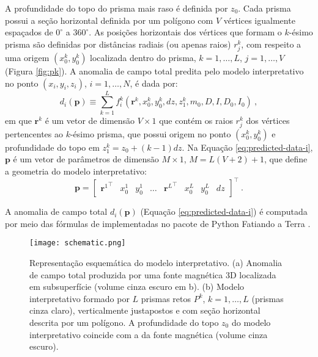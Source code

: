 A profundidade do topo do prisma mais raso é definida por $z_{0}$.
Cada prisma possui a seção horizontal definida por um polígono com $V$ vértices igualmente espaçados de $0^{\circ}$ a $360^{\circ}$.
As posições horizontais dos vértices que formam o $k$-ésimo prisma
são definidas por distâncias radiais (ou apenas raios) $r^{k}_{j}$, com respeito a uma origem $(x_{0}^{k}, y_{0}^{k})$ localizada dentro do prisma, $k = 1, \dots, L$, $j = 1, \dots, V$ (Figura \ref{fig:pk}).
A anomalia de campo total predita pelo modelo interpretativo no ponto $(x_{i}, y_{i}, z_{i})$, $i = 1, \dots, N$, é dada por:
\begin{equation}
d_{i} (\mathbf{p}) \equiv \sum\limits_{k=1}^{L} f_{i}^{k}(\mathbf{r}^{k}, x_{0}^{k}, y_{0}^{k}, dz, z_{1}^{k}, m_{0}, D, I, D_{0}, I_{0}) \: ,
\label{eq:predicted-data-i}
\end{equation}
em que $\mathbf{r}^{k}$ é um vetor de dimensão $V \times 1$ que contém os raios $r^{k}_{j}$ dos vértices pertencentes ao $k$-ésimo prisma, que possui origem no ponto $(x_{0}^{k}, y_{0}^{k})$ e profundidade do topo em $z_{1}^{k} = z_{0} + (k-1)dz$.
Na Equação \ref{eq:predicted-data-i}, $\mathbf{p}$ é um vetor de parâmetros de dimensão $M \times 1$, $ M=L(V+2) +1 $, que define a geometria do modelo interpretativo:
\begin{equation}
\mathbf{p} = \begin{bmatrix} 
{\mathbf{r}^{1}}^{\top} & x_{0}^{1} & y_{0}^{1} & \dots & 
{\mathbf{r}^{L}}^{\top} & x_{0}^{L} & y_{0}^{L} & dz
\end{bmatrix}^{\top} \: .
\label{eq:p-vector}
\end{equation}

A anomalia de campo total $d_{i} (\mathbf{p})$ 
(Equação \ref{eq:predicted-data-i}) é computada por meio das fórmulas de \cite{plouff1976} implementadas no pacote de Python 
Fatiando a Terra \citep{uieda-etal2013}.

\begin{figure}[!htb]
	\centering
	\texttt{[image: schematic.png]}
	\caption{Representação esquemática do modelo interpretativo. (a) Anomalia de campo total produzida por uma fonte magnética 3D localizada em subsuperfície (volume cinza escuro em b). (b) Modelo interpretativo formado por $ L $ prismas retos $ P^k$, $k = 1, \dots , L $ (prismas cinza claro), verticalmente justapostos e com seção horizontal descrita por um polígono. A profundidade do topo $z_0$ do modelo interpretativo coincide com a da fonte magnética (volume cinza escuro).}
	\label{fig:schematic}
\end{figure}

